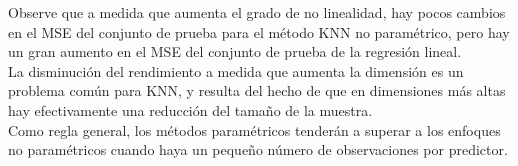  Observe que a medida que aumenta el grado de no linealidad, hay pocos cambios en el MSE del conjunto de prueba para el método KNN no paramétrico, pero hay un gran aumento en el MSE del conjunto de prueba de la regresión lineal. \\

 La disminución del rendimiento a medida que aumenta la dimensión es un problema común para KNN, y resulta del hecho de que en dimensiones más altas hay efectivamente una reducción del tamaño de la muestra.\\

 Como regla general, los métodos paramétricos tenderán a superar a los enfoques no paramétricos cuando haya un pequeño número de observaciones por predictor.\\








